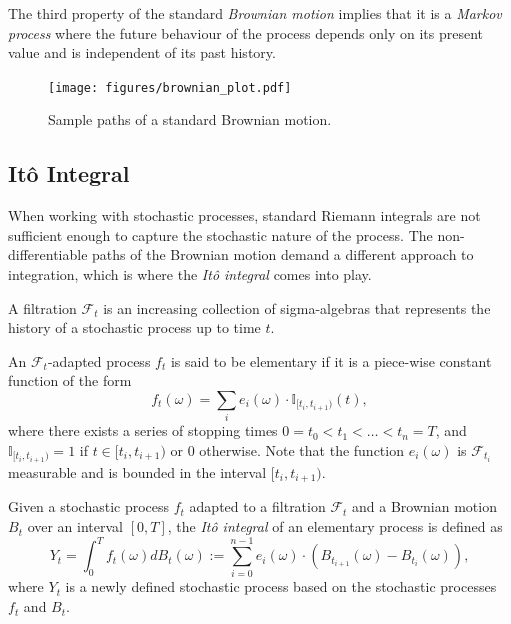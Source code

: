 The third property of the standard \textit{Brownian motion} implies that it is a \textit{Markov process} where the future behaviour of the process
depends only on its present value and is independent of its past history.

\begin{figure}[H]
    \centering
    \texttt{[image: figures/brownian\_plot.pdf]}
    \caption{Sample paths of a standard Brownian motion.}
    \label{fig:bm-sample-paths}
\end{figure}

\subsection{It\^{o} Integral}

When working with stochastic processes, standard Riemann integrals are not sufficient enough to capture the stochastic nature of the process. 
The non-differentiable paths of the Brownian motion demand a different approach to integration, which is where the \textit{It\^{o} integral} comes into play.

\begin{definition}
A filtration $\mathcal{F}_t$ is an increasing collection of sigma-algebras that represents the history of a stochastic process up to time $t$.
\end{definition}

\begin{definition}
An $\mathcal{F}_t$-adapted process $f_t$ is said to be elementary if it is a piece-wise constant function of the form 
\begin{equation}
    f_t(\omega) = \sum_{i} e_i(\omega) \cdot \mathbb{I}_{[t_i, t_{i+1})}(t),
\end{equation}
where there exists a series of stopping times $0 = t_0 < t_1 < \ldots < t_n = T$, and $\mathbb{I}_{[t_i, t_{i+1})} = 1$ if $t \in [t_i, t_{i+1})$ or 0 otherwise.
Note that the function $e_i(\omega)$ is $\mathcal{F}_{t_i}$ measurable and is bounded in the interval $[t_i, t_{i+1})$.
\end{definition}
\begin{definition}
    Given a stochastic process $f_t$ adapted to a filtration $\mathcal{F}_t$ and a Brownian motion $B_t$ over an interval $[0,T]$, the \textit{It\^{o} integral} of an elementary process is defined as
    \begin{equation}
        Y_t = \int_0^T f_t(\omega) dB_t(\omega) := \sum_{i = 0}^{n-1} e_i (\omega) \cdot (B_{t_{i+1}}(\omega) - B_{t_i} (\omega)),
    \end{equation}
    where $Y_t$ is a newly defined stochastic process based on the stochastic processes $f_t$ and $B_t$.
\end{definition}

